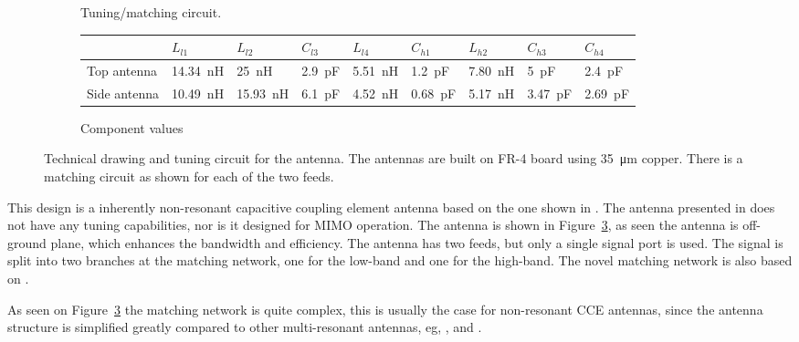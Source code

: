 \begin{figure}[htbp]
\begin{subfigure}[b]{0.49\linewidth}
        \caption{Tuning/matching circuit.}
        \label{fig:ant3schematic}
    \end{subfigure}
    \par\bigskip
        \begin{subfigure}[b]{\linewidth}
        \centering
        \begin{tabular}{|l|l|l|l|l|l|l|l|l|}
            \hline
                         & $L_{l1}$       & $L_{l2}$        & $C_{l3}$      & $L_{l4}$       & $C_{h1}$       & $L_{h2}$      & $C_{h3}$      & $C_{h4}$    \\
            \hline
            Top antenna  & \SI{14,34}{nH}  & \SI{25}{nH}  & \SI{2,9}{pF} & \SI{5,51}{nH} & \SI{1,2}{pF} & \SI{7,80}{nH} & \SI{5}{pF} & \SI{2.4}{pF} \\
            Side antenna & \SI{10,49}{nH}  & \SI{15,93}{nH}  & \SI{6.1}{pF} & \SI{4.52}{nH} & \SI{0.68}{pF} & \SI{5.17}{nH} & \SI{3.47}{pF} & \SI{2.69}{pF} \\
            \hline
        \end{tabular}
        \caption{Component values}
        \label{fig:ant3schematic}
    \end{subfigure}

    \caption{Technical drawing and tuning circuit for the antenna.  The antennas are built on FR-4 board using \SI{35}{\micro\meter} copper. There is a matching circuit as shown for each of the two feeds.}
    \label{fig:ant3techschem}
\end{figure}


This design is a inherently non-resonant capacitive coupling element antenna based on the one shown in \cite{valkonen2013inherently}. The antenna presented in \cite{valkonen2013inherently} does not have any tuning capabilities, nor is it designed for MIMO operation. The antenna is shown in Figure~\ref{fig:ant3techschem}, as seen the antenna is off-ground plane, which enhances the bandwidth and efficiency. The antenna has two feeds, but only a single signal port is used. The signal is split into two branches at the matching network, one for the low-band and one for the high-band. The novel matching network is also based on \cite{valkonen2013inherently}.

As seen on Figure~\ref{fig:ant3techschem} the matching network is quite complex, this is usually the case for non-resonant CCE antennas, since the antenna structure is simplified greatly compared to other multi-resonant antennas, eg, \cite{Tatomirescu2014AT}, \cite{Zhekov2015} and \cite{Zhang2013Diag}.

